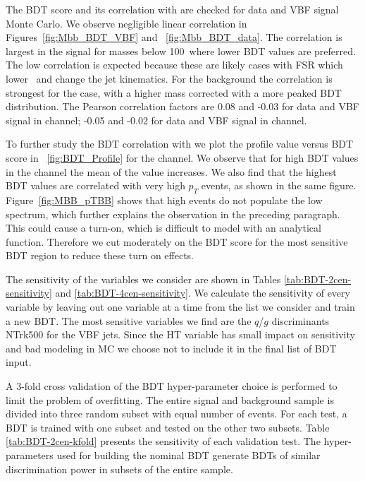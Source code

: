 The BDT score and its correlation with \Mbb are checked for data and VBF signal Monte Carlo. We observe negligible linear correlation in Figures~\ref{fig:Mbb_BDT_VBF} and ~\ref{fig:Mbb_BDT_data}.  The correlation is largest in the signal for masses below 100~\GeV where lower BDT values are preferred. The low \Mbb{} correlation is expected because these are likely cases with FSR which lower \Mbb~and change the jet kinematics.  For the background the correlation is strongest for the \twocentral case, with a higher mass corrected with a more peaked BDT distribution. The Pearson correlation factors are 0.08 and -0.03 for data and VBF signal in \twocentral channel; -0.05 and -0.02 for data and VBF signal in \fourcentral channel.

To further study the BDT correlation with \Mbb{} we plot the profile \Mbb{} value versus BDT score in ~\ref{fig:BDT_Profile} for the \twocentral channel.  We observe that for high BDT values in the \twocentral channel the mean of the \Mbb value increases.  We also find that  the highest BDT values are correlated with very high $p_T$ events, as shown in the same figure.  Figure~\ref{fig:MBB_pTBB} shows that high \pTbb{} events do not populate the low \Mbb{} spectrum, which further explains the observation in the preceding paragraph. This could cause a turn-on, which is difficult to model with an analytical function.  Therefore we cut moderately on the BDT score for the most sensitive BDT region to reduce these turn on effects. 

The sensitivity of the variables we consider are shown in Tables \ref{tab:BDT-2cen-sensitivity} and \ref{tab:BDT-4cen-sensitivity}. We calculate the sensitivity of every variable by leaving out one variable at a time from the list we consider and train a new BDT. The most sensitive variables we find are the $q$/$g$ discriminants NTrk500 for the VBF jets. Since the HT variable has small impact on sensitivity and bad modeling in MC we choose not to include it in the final list of BDT input. 

A 3-fold cross validation of the BDT hyper-parameter choice is performed to limit the problem of overfitting. The entire signal and background sample is divided into three random subset with equal number of events. For each test, a BDT is trained with one subset and tested on the other two subsets. Table \ref{tab:BDT-2cen-kfold} presents the sensitivity of each validation test. The hyper-parameters used for building the nominal BDT generate BDTs of similar discrimination power in subsets of the entire sample. 

